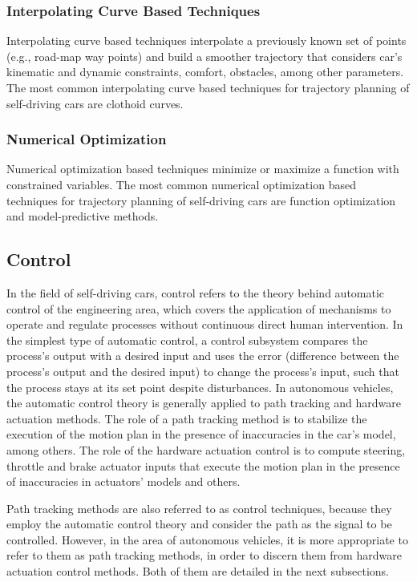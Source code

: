 \subsubsection{Interpolating Curve Based Techniques}
Interpolating curve based techniques interpolate a previously known set of
points (e.g., road-map way points) and build a smoother trajectory that considers
car’s kinematic and dynamic constraints, comfort, obstacles, among other
parameters. The most common interpolating curve based techniques for trajectory
planning of self-driving cars are clothoid curves.

\subsubsection{Numerical Optimization}
Numerical optimization based techniques minimize or maximize a function with
constrained variables. The most common numerical optimization based techniques
for trajectory planning of self-driving cars are function optimization and
model-predictive methods.

\subsection{Control}

In the field of self-driving cars, control refers to the theory behind automatic
control of the engineering area, which covers the application of mechanisms to
operate and regulate processes without continuous direct human intervention. In
the simplest type of automatic control, a control subsystem compares the
process’s output with a desired input and uses the error (difference between the
process’s output and the desired input) to change the process’s input, such that
the process stays at its set point despite disturbances. In autonomous vehicles,
the automatic control theory is generally applied to path tracking and hardware
actuation methods. The role of a path tracking method is to stabilize the
execution of the motion plan in the presence of inaccuracies in the car’s model,
among others. The role of the hardware actuation control is to compute steering,
throttle and brake actuator inputs that execute the motion plan in the presence
of inaccuracies in actuators’ models and others.

Path tracking methods are also referred to as control techniques, because they
employ the automatic control theory and consider the path as the signal to be
controlled. However, in the area of autonomous vehicles, it is more appropriate
to refer to them as path tracking methods, in order to discern them from
hardware actuation control methods. Both of them are detailed in the next
subsections.


